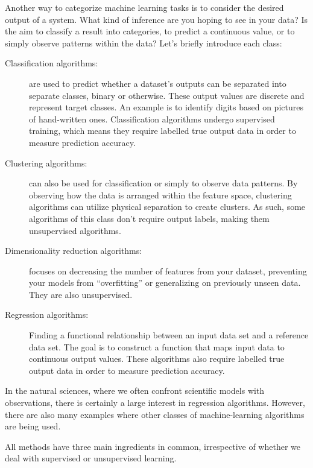 \documentclass[%
oneside,                 %
final,                   %
10pt]{article}
\begin{document}
Another way to categorize machine learning tasks is to consider the
desired output of a system. What kind of inference are you hoping to see in your data? Is the aim to classify a result into categories, to predict a continuous value, or to simply observe patterns within the data? Let’s briefly introduce each class:

\begin{description}
\item[Classification algorithms:] 
  are used to predict whether a dataset’s outputs can be separated into separate classes, binary or otherwise. These output values are discrete and represent target classes. An example is to identify  digits based on pictures of hand-written ones. Classification algorithms undergo supervised training, which means they require labelled true output data in order to measure prediction accuracy.

\item[Clustering algorithms:] 
  can also be used for classification or simply to observe data patterns. By observing how the data is arranged within the feature space, clustering algorithms can utilize physical separation to create clusters. As such, some algorithms of this class don’t require output labels, making them unsupervised algorithms.

\item[Dimensionality reduction algorithms:] 
  focuses on decreasing the number of features from your dataset, preventing your models from “overfitting” or generalizing on previously unseen data. They are also unsupervised.

\item[Regression algorithms:] 
  Finding a functional relationship between an input data set and a reference data set. The goal is to construct a function that maps input data to continuous output values. These algorithms also require labelled true output data in order to measure prediction accuracy.
\end{description}

\noindent
In the natural sciences, where we often confront scientific models with observations, there is certainly a large interest in regression algorithms. However, there are also many examples where other classes of machine-learning algorithms are being used.

All methods have three main ingredients in common, irrespective of whether we deal with supervised or unsupervised learning. 
\end{document}
